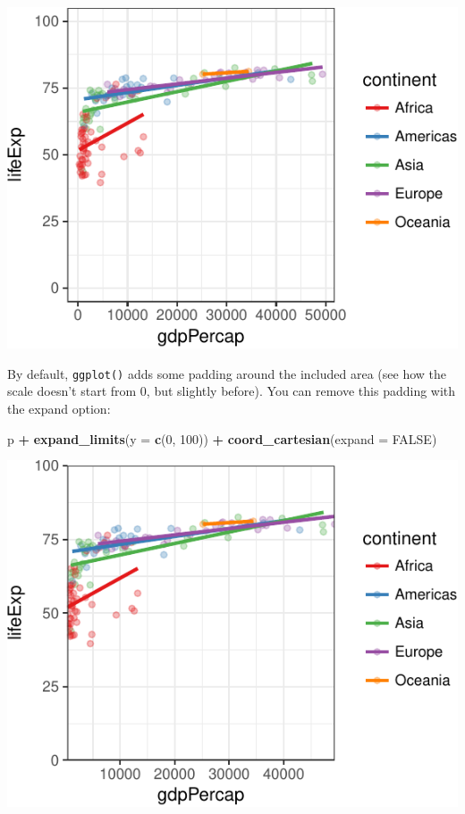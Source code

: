\documentclass[12pt,]{krantz}
\makeatletter
\newenvironment{Shaded}{\begin{snugshade}}{\end{snugshade}}
\newcommand{\DataTypeTok}[1]{\textcolor[rgb]{0.13,0.29,0.53}{#1}}
\newcommand{\DecValTok}[1]{\textcolor[rgb]{0.00,0.00,0.81}{#1}}
\newcommand{\KeywordTok}[1]{\textcolor[rgb]{0.13,0.29,0.53}{\textbf{#1}}}
\newcommand{\NormalTok}[1]{#1}
\newcommand{\OperatorTok}[1]{\textcolor[rgb]{0.81,0.36,0.00}{\textbf{#1}}}
\newcommand{\OtherTok}[1]{\textcolor[rgb]{0.56,0.35,0.01}{#1}}
\newcommand{\StringTok}[1]{\textcolor[rgb]{0.31,0.60,0.02}{#1}}
\newenvironment{kframe}{%
\medskip{}
\setlength{\fboxsep}{.8em}
 \def\at@end@of@kframe{}%
 \ifinner\ifhmode%
  \def\at@end@of@kframe{\end{minipage}}%
  \begin{minipage}{\columnwidth}%
 \fi\fi%
 \def\FrameCommand##1{\hskip\@totalleftmargin \hskip-\fboxsep
 \colorbox{shadecolor}{##1}\hskip-\fboxsep
     \hskip-\linewidth \hskip-\@totalleftmargin \hskip\columnwidth}%
 \MakeFramed {\advance\hsize-\width
   \@totalleftmargin\z@ \linewidth\hsize
   \@setminipage}}%
 {\par\unskip\endMakeFramed%
 \at@end@of@kframe}
\renewenvironment{Shaded}{\begin{kframe}}{\end{kframe}}
\theoremstyle{definition}
\theoremstyle{definition}
\theoremstyle{definition}
\theoremstyle{remark}
\makeatother
\begin{document}
\includegraphics{05_fine_tuning_plots_files/figure-latex/unnamed-chunk-4-1.pdf}

By default, \texttt{ggplot()} adds some padding around the included area
(see how the scale doesn't start from 0, but slightly before). You can
remove this padding with the expand option:

\begin{Shaded}
\begin{Highlighting}[]
\NormalTok{p }\OperatorTok{+}
\StringTok{  }\KeywordTok{expand_limits}\NormalTok{(}\DataTypeTok{y =} \KeywordTok{c}\NormalTok{(}\DecValTok{0}\NormalTok{, }\DecValTok{100}\NormalTok{)) }\OperatorTok{+}
\StringTok{  }\KeywordTok{coord_cartesian}\NormalTok{(}\DataTypeTok{expand =} \OtherTok{FALSE}\NormalTok{)}
\end{Highlighting}
\end{Shaded}

\includegraphics{05_fine_tuning_plots_files/figure-latex/unnamed-chunk-5-1.pdf}
\end{document}
